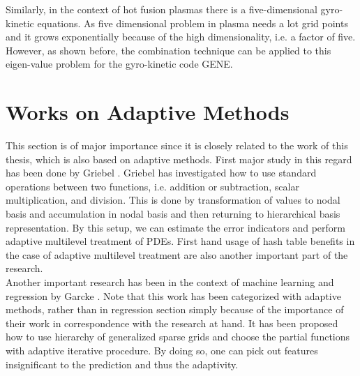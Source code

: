 Similarly, in the context of hot fusion plasmas there is a five-dimensional gyro-kinetic equations. As five dimensional problem in plasma needs a lot grid points and it grows exponentially because of the high dimensionality, i.e. a factor of five. However, as shown before, the combination technique can be applied to this eigen-value problem for the gyro-kinetic code GENE\cite{Kowitz2013}.
\section{Works on Adaptive Methods}
This section is of major importance since it is closely related to the work of this thesis, which is also based on adaptive methods. First major study in this regard has been done by Griebel \cite{Griebel1998}.
 Griebel has investigated how to use standard operations between two functions, i.e. addition or subtraction, scalar multiplication, and division. This is done by transformation of values to nodal basis and accumulation in nodal basis and then returning to hierarchical basis representation. By this setup, we can estimate the error indicators and perform adaptive multilevel treatment of PDEs. First hand usage of hash table benefits in the case of adaptive multilevel treatment are also another important part of the research\cite{Griebel1998}.\\
 
Another important research has been in the context of machine learning and regression by Garcke  \cite{Garcke2007a}. Note that this work has been categorized with adaptive methods, rather than in regression section simply because of the importance of their work in correspondence with the research at hand. It has been proposed how to use hierarchy of generalized sparse grids and choose the partial functions with adaptive iterative procedure. By doing so, one can pick out features insignificant to the prediction and thus the adaptivity.



